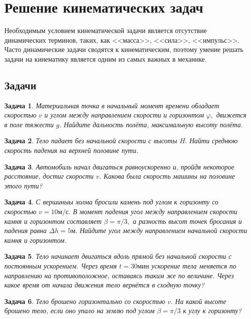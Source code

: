 \documentclass[a5paper,11pt]{article}
\newtheorem{task}{Задача}
\begin{document}
\section{Решение кинематических задач }
Необходимым условием кинематической задачи является отсутствие динамических терминов, таких, как
<<масса>>, <<сила>>, <<импульс>>. 
Часто динамические задачи сводятся к кинематическим, поэтому
умение решать задачи на кинематику является одним из самых важных в механике. 
\subsection{Задачи}
\begin{task}
Материальная точка в начальный момент времени обладает скоростью $v$ и углом между
направлением скорости и горизонтом $\varphi,$ движется в поле тяжести $g$. Найдите
дальность полёта, максимальную высоту полёта.
\label{task:k-95-1}
\end{task}
\begin{task}
Тело падает без начальной скорости с высоты $H.$ Найти среднюю скорость падения на верхней
половине пути.
\label{task:k-96-1}
\end{task}
\begin{task}
Автомобиль начал двигаться равноускоренно и, пройдя некоторое расстояние, достиг скорости $v.$
Какова была скорость машины на половине этого пути?
\label{task:k-97-1-1}
\end{task}
\begin{task}
С вершиныы холма бросили камень под углом к горизонту со скоростью $v = 10\text{м/с}.$ В момент падения
угол  между направлением скорости камня и горизонтом составляет $\beta = \pi/3,$ а разность высот точек
бросания и падения равна $\Delta h = 5 \text{м}.$ Найдите угол между направлением начальной скорости
камня и горизонтом.
\label{task:k-97-4-1}
\end{task}
\begin{task}
Тело начинает двигаться вдоль прямой без начальной скорости с постоянным ускорением. Через время
$t=30\text{мин}$ ускорение тела меняется по направлению на противоположное, оставаясь таким же по величине.
Через какое время от начала движения тело вернётся в сходную точку?
\label{task:k-97-1-2}
\end{task}
\begin{task}
Тело брошено горизонтально со скоростью $v.$ На какой высоте брошено тело, если оно
упало на землю под углом $\beta = \pi/3$ к углу к горизонту?
\label{task:k-98-1-1}
\end{task}
\end{document}
